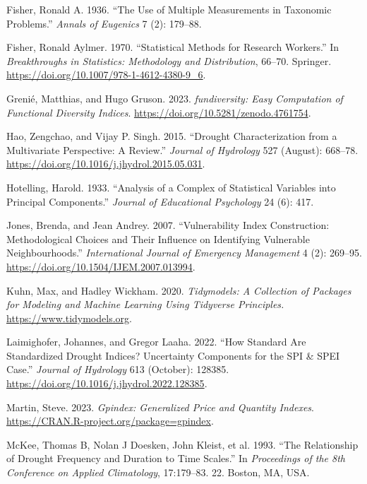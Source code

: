 \documentclass[
]{interact}
\newlength{\cslhangindent}
\newenvironment{CSLReferences}[2] %
 {\begin{list}{}{%
  \setlength{\itemindent}{0pt}
  \setlength{\leftmargin}{0pt}
  \setlength{\parsep}{0pt}
  \ifodd #1
   \setlength{\leftmargin}{\cslhangindent}
   \setlength{\itemindent}{-1\cslhangindent}
  \fi
  \setlength{\itemsep}{#2\baselineskip}}}
 {\end{list}}
\begin{document}
\begin{CSLReferences}{1}{0}
Fisher, Ronald A. 1936. {``The Use of Multiple Measurements in Taxonomic
Problems.''} \emph{Annals of Eugenics} 7 (2): 179--88.

Fisher, Ronald Aylmer. 1970. {``Statistical Methods for Research
Workers.''} In \emph{Breakthroughs in Statistics: Methodology and
Distribution}, 66--70. Springer.
\url{https://doi.org/10.1007/978-1-4612-4380-9_6}.

Grenié, Matthias, and Hugo Gruson. 2023. \emph{{fundiversity}: Easy
Computation of Functional Diversity Indices}.
\url{https://doi.org/10.5281/zenodo.4761754}.

Hao, Zengchao, and Vijay P. Singh. 2015. {``Drought Characterization
from a Multivariate Perspective: {A} Review.''} \emph{Journal of
Hydrology} 527 (August): 668--78.
\url{https://doi.org/10.1016/j.jhydrol.2015.05.031}.

Hotelling, Harold. 1933. {``Analysis of a Complex of Statistical
Variables into Principal Components.''} \emph{Journal of Educational
Psychology} 24 (6): 417.

Jones, Brenda, and Jean Andrey. 2007. {``Vulnerability Index
Construction: Methodological Choices and Their Influence on Identifying
Vulnerable Neighbourhoods.''} \emph{International Journal of Emergency
Management} 4 (2): 269--95.
\url{https://doi.org/10.1504/IJEM.2007.013994}.

Kuhn, Max, and Hadley Wickham. 2020. \emph{Tidymodels: A Collection of
Packages for Modeling and Machine Learning Using Tidyverse Principles.}
\url{https://www.tidymodels.org}.

Laimighofer, Johannes, and Gregor Laaha. 2022. {``How Standard Are
Standardized Drought Indices? {Uncertainty} Components for the {SPI} \&
{SPEI} Case.''} \emph{Journal of Hydrology} 613 (October): 128385.
\url{https://doi.org/10.1016/j.jhydrol.2022.128385}.

Martin, Steve. 2023. \emph{Gpindex: Generalized Price and Quantity
Indexes}. \url{https://CRAN.R-project.org/package=gpindex}.

McKee, Thomas B, Nolan J Doesken, John Kleist, et al. 1993. {``The
Relationship of Drought Frequency and Duration to Time Scales.''} In
\emph{Proceedings of the 8th Conference on Applied Climatology},
17:179--83. 22. Boston, MA, USA.


\end{CSLReferences}
\end{document}
